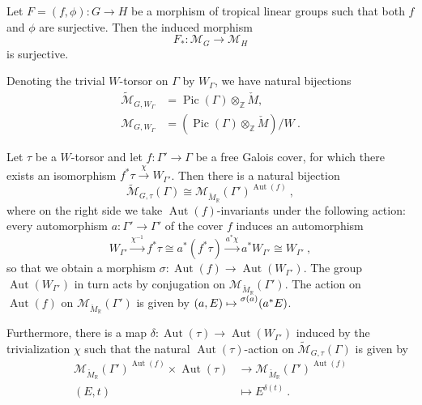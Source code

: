 \documentclass[10pt,a4paper]{amsart}
\DeclareMathOperator{\Aut}{Aut}
\newcommand{\Ga}{\Gamma}
\newcommand{\Mcheck}{{\check{M}}}
\DeclareMathOperator{\Pic}{Pic}
\newcommand{\R}{\mathbb{R}}
\newcommand{\Z}{\mathbb{Z}}
\newcommand{\mc}[1]{{\mathcal{#1}}}
\begin{document}
\begin{lemma}
\label{lem:surjective morphism of groups yields surjective morphism of moduli}
Let $F=(f,\phi)\colon G\to H$ be a morphism of tropical linear groups such that both $f$ and $\phi$ are surjective. Then the induced morphism
\[
    F_*\colon \mc M_G\longrightarrow \mc M_H
\]
is surjective. 
\end{lemma}

\begin{proposition}
\label{prop:fiber over trivial W-torsor}
Denoting the trivial $W$-torsor on $\Gamma$ by $W_\Gamma$, we have natural bijections 
\begin{align*}
    \widetilde{\mc M}_{G,W_\Gamma}
        &= \Pic(\Gamma)\otimes_\Z \Mcheck, \\[3pt]
    \mc M_{G,W_\Gamma}
        &= (\Pic(\Gamma)\otimes_\Z \Mcheck)/W \ .
\end{align*}


\end{proposition}

\begin{lemma}
\label{lem:description of torsors as equivariant torsors on cover}
Let $\tau$ be a $W$-torsor and let $f\colon \Gamma'\to \Gamma$ be a free Galois cover, for which there exists an isomorphism $f^*\tau\xrightarrow{\chi} W_{\Gamma'}$. Then there is a natural bijection
\[
    \widetilde{\mc M}_{G,\tau}(\Ga)\cong \mc M_{\Mcheck_\R}(\Gamma')^{\Aut(f)} \ ,
\]
where on the right side we take $\Aut(f)$-invariants under the following action: every automorphism $a:\Gamma'\to \Gamma'$ of the cover $f$ induces an automorphism 
\[
    W_{\Gamma'}\xrightarrow{\chi^{-1}}f^*\tau\cong a^*(f^*\tau)\xrightarrow{a^*\chi}a^*W_{\Gamma'}\cong W_{\Gamma'} \ ,
\]
so that we obtain a morphism $\sigma\colon\Aut(f)\to \Aut(W_{\Gamma'})$. The group $\Aut(W_{\Gamma'})$ in turn acts by conjugation on $\mc M_{\Mcheck_\R}(\Gamma')$. The action on $\Aut(f)$ on $\mc M_{\Mcheck_\R}(\Gamma')$ is given by $(a,E)\mapsto \prescript{\sigma(a)}{}{(a^*E)}$.

Furthermore, there is a map $\delta\colon \Aut(\tau)\to \Aut(W_{\Gamma'})$ induced by the trivialization $\chi$ such that the natural $\Aut(\tau)$-action on $\widetilde{\mc M}_{G,\tau}(\Ga)$ is given by
\begin{equation*}\begin{split}
\mc M_{\Mcheck_\R}(\Gamma')^{\Aut(f)}\times \Aut(\tau)&\longrightarrow \mc M_{\Mcheck_\R}(\Gamma')^{\Aut(f)}\\
(E,t)&\longmapsto {E}^{\delta(t)} \ .
\end{split}\end{equation*}
\end{lemma}
\end{document}
